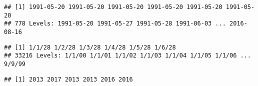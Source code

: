 \documentclass[]{article}
\newenvironment{Shaded}{\begin{snugshade}}{\end{snugshade}}
\newcommand{\KeywordTok}[1]{\textcolor[rgb]{0.13,0.29,0.53}{\textbf{#1}}}
\newcommand{\OperatorTok}[1]{\textcolor[rgb]{0.81,0.36,0.00}{\textbf{#1}}}
\newcommand{\NormalTok}[1]{#1}
\begin{document}
\begin{verbatim}
## [1] 1991-05-20 1991-05-20 1991-05-20 1991-05-20 1991-05-20 1991-05-20
## 778 Levels: 1991-05-20 1991-05-27 1991-05-28 1991-06-03 ... 2016-08-16
\end{verbatim}

\begin{Shaded}
\end{Shaded}

\begin{verbatim}
## [1] 1/1/28 1/2/28 1/3/28 1/4/28 1/5/28 1/6/28
## 33216 Levels: 1/1/00 1/1/01 1/1/02 1/1/03 1/1/04 1/1/05 1/1/06 ... 9/9/99
\end{verbatim}

\begin{Shaded}
\end{Shaded}

\begin{verbatim}
## [1] 2013 2017 2013 2013 2016 2016
\end{verbatim}
\end{document}
